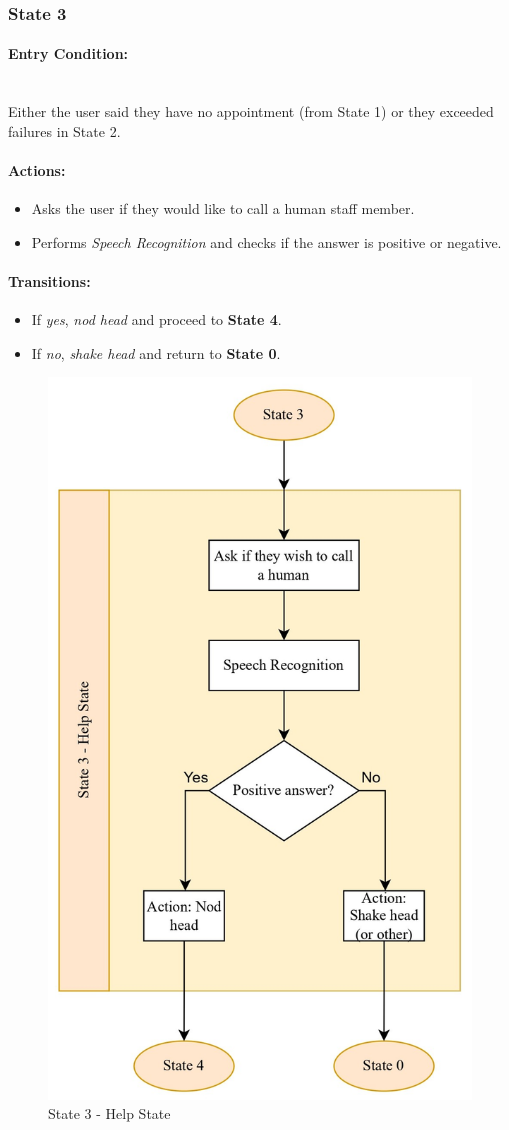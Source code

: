 \documentclass[conference]{IEEEtran}
\begin{document}
\subsubsection{State 3}
\paragraph{Entry Condition:}
\mbox{}\\
Either the user said they have no appointment (from State 1) or they exceeded failures in State 2.

\paragraph{Actions:}
\begin{itemize}
  \item Asks the user if they would like to call a human staff member.
  \item Performs \emph{Speech Recognition} and checks if the answer is positive or negative.
\end{itemize}

\paragraph{Transitions:}
\begin{itemize}
  \item If \emph{yes}, \emph{nod head} and proceed to \textbf{State 4}.
  \item If \emph{no}, \emph{shake head} and return to \textbf{State 0}.
\end{itemize}

\begin{figure}
    \centering
    \includegraphics[width=.6\linewidth]{State 3 - Help State.jpg}
    \caption{State 3 - Help State}
    \label{State 3 - Help State}
\end{figure}
\end{document}
